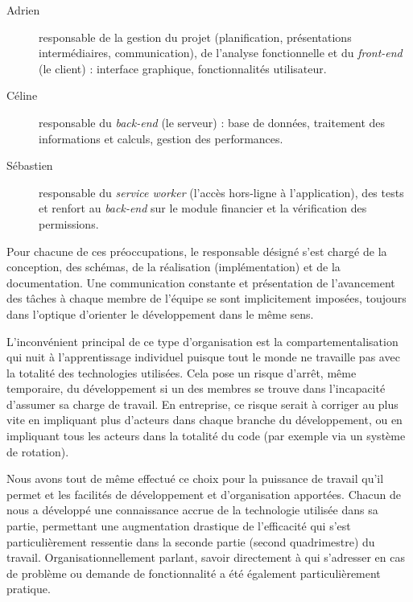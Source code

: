 \documentclass{EPL-master-thesis-covers-FR}
\begin{document}
				\begin{description}
					\item[Adrien] responsable de la gestion du projet (planification, présentations intermédiaires, communication), de l'analyse fonctionnelle et du \emph{front-end} (le client) : interface graphique, fonctionnalités utilisateur.

					\item[Céline] responsable du \emph{back-end} (le serveur) : base de données, traitement des informations et calculs, gestion des performances.

					\item[Sébastien] responsable du \emph{service worker} (l'accès hors-ligne à l'application), des tests et renfort au \emph{back-end} sur le module financier et la vérification des permissions.
				\end{description}

				Pour chacune de ces préoccupations, le responsable désigné s'est chargé de la conception, des schémas, de la réalisation (implémentation) et de la documentation. Une communication constante et présentation de l'avancement des tâches à chaque membre de l'équipe se sont implicitement imposées, toujours dans l'optique d'orienter le développement dans le même sens.

				L'inconvénient principal de ce type d'organisation est la compartementalisation qui nuit à l'apprentissage individuel puisque tout le monde ne travaille pas avec la totalité des technologies utilisées. Cela pose un risque d'arrêt, même temporaire, du développement si un des membres se trouve dans l'incapacité d'assumer sa charge de travail. En entreprise, ce risque serait à corriger au plus vite en impliquant plus d'acteurs dans chaque branche du développement, ou en impliquant tous les acteurs dans la totalité du code (par exemple via un système de rotation).

				Nous avons tout de même effectué ce choix pour la puissance de travail qu'il permet et les facilités de développement et d'organisation apportées. Chacun de nous a développé une connaissance accrue de la technologie utilisée dans sa partie, permettant une augmentation drastique de l'efficacité qui s'est particulièrement ressentie dans la seconde partie (second quadrimestre) du travail. Organisationnellement parlant, savoir directement à qui s'adresser en cas de problème ou demande de fonctionnalité a été également particulièrement pratique.
\end{document}
